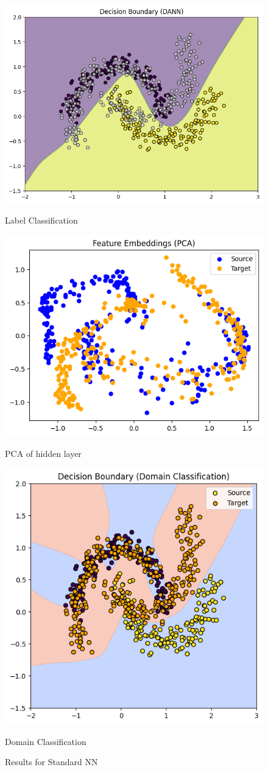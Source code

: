 \documentclass{article}
\begin{document}
\begin{figure}
\centering
\begin{minipage}{0.32\linewidth}
\centering
\includegraphics[width=0.7\linewidth]{DANN/label_decision_vanilla.png}
\caption{\small Label Classification}
\label{fig:label_decision_vanilla}
\end{minipage}
\hfill
\begin{minipage}{0.32\linewidth}
\centering
\includegraphics[width=0.7\linewidth]{DANN/feature_vanilla.png}
\caption{\small PCA of hidden layer}
\label{fig:feature_vanilla}
\end{minipage}
\hfill
\begin{minipage}{0.32\linewidth}
\centering
\includegraphics[width=0.55\linewidth]{DANN/domain_deciison_vanilla.png}
\caption{\small Domain Classification}
\label{fig:domain_decision_vanilla}
\end{minipage}
\caption{\small Results for Standard NN}
\end{figure}
\end{document}
